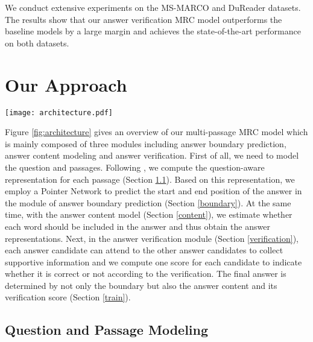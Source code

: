 \documentclass[11pt,a4paper]{article}
\newcommand{\figref}[1]{Figure \ref{#1}}
\newcommand{\secref}[1]{Section \ref{#1}}
\begin{document}
We conduct extensive experiments on the MS-MARCO \cite{marco} and DuReader \cite{dureader} datasets. The results show that our answer verification MRC model outperforms the baseline models by a large margin and achieves the state-of-the-art performance on both datasets. 












 
\section{Our Approach}
\label{approach}


\begin{figure*}[ht]
\centering
\texttt{[image: architecture.pdf]}

\caption{Overview of our method for multi-passage machine reading comprehension}
\label{fig:architecture}
\end{figure*}

\figref{fig:architecture} gives an overview of our multi-passage MRC model
which is mainly composed of three modules including answer boundary prediction, answer content modeling and answer verification.
First of all, we need to model the question and passages. Following , we compute the question-aware representation for each passage (\secref{modeling}).
Based on this representation, we employ a Pointer Network \cite{pointer-net} to predict the start and end position of the answer in the module of answer boundary prediction (\secref{boundary}). 
At the same time, with the answer content model (\secref{content}), we estimate whether each word should be included in the answer and thus obtain the answer representations. 
Next, in the answer verification module (\secref{verification}), each answer candidate can attend to the other answer candidates to collect supportive information and we compute one score for each candidate to indicate whether it is correct or not according to the verification. 
The final answer is determined by not only the boundary but also the answer content and its verification score (\secref{train}).



\subsection{Question and Passage Modeling}
\label{modeling}
\end{document}
